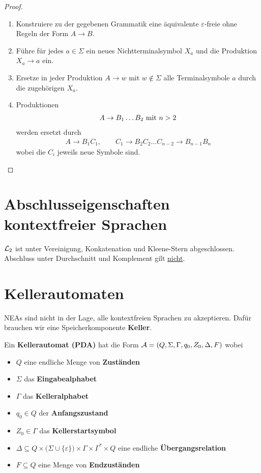 \begin{proof}\
	\begin{enumerate}
		\item Konstruiere zu der gegebenen Grammatik eine äquivalente $\varepsilon$-freie ohne Regeln der Form $A\to B$.
		\item Führe für jedes $a\in\Sigma$ ein neues Nichtterminalsymbol $X_a$ und die Produktion $X_a\to a$ ein.
		\item Ersetze in jeder Produktion $A\to w$ mit $w\not\in\Sigma$ alle Terminalsymbole $a$ durch die zugehörigen $X_a$.
		\item Produktionen 
		\begin{align*}
			A\to B_1\ldots B_2\mit n>2
		\end{align*}
		werden ersetzt durch
		\begin{align*}
			A\to B_1C_1,\qquad C_1\to B_2C_2\ldots C_{n-2}\to B_{n-1}B_n
		\end{align*}
		wobei die $C_i$ jeweils neue Symbole sind.
	\end{enumerate}
\end{proof}

\section{Abschlusseigenschaften kontextfreier Sprachen} %

\begin{satz}\label{satz9.1}
	$\L_2$ ist unter Vereinigung, Konkatenation und Kleene-Stern abgeschlossen. 
	Abschluss unter Durchschnitt und Komplement gilt \underline{nicht}.
\end{satz}

\section{Kellerautomaten}
NEAs sind nicht in der Lage, alle kontextfreien Sprachen zu akzeptieren.
Dafür brauchen wir eine Speicherkomponente \textbf{Keller}.

\begin{definition}\label{def10.1Kellerautomat}
	Ein \textbf{Kellerautomat (PDA)} hat die Form $\A=(Q,\Sigma,\Gamma,q_0,Z_0,\Delta,F)$ wobei
	\begin{itemize}
		\item $Q$ eine endliche Menge von \textbf{Zuständen}
		\item $\Sigma$ das \textbf{Eingabealphabet}
		\item $\Gamma$ das \textbf{Kelleralphabet}
		\item $q_0\in Q$ der \textbf{Anfangszustand}
		\item $Z_0\in\Gamma$ das \textbf{Kellerstartsymbol}
		\item $\Delta\subseteq Q\times\big(\Sigma\cup\lbrace\varepsilon\rbrace\big)\times\Gamma\times\Gamma^\ast\times Q$ eine endliche \textbf{Übergangsrelation}
		\item $F\subseteq Q$ eine Menge von \textbf{Endzuständen}
	\end{itemize}
\end{definition}

